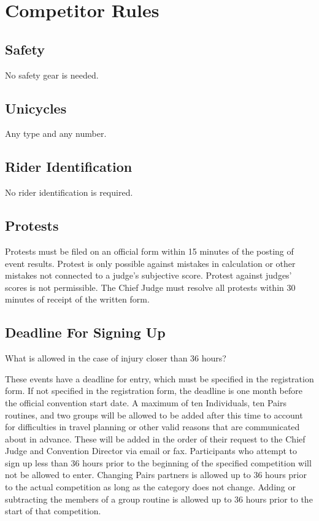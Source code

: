 \chapter{Competitor Rules}

\section{Safety}

No safety gear is needed.

\section{Unicycles}

Any type and any number.

\section{Rider Identification}

No rider identification is required. %

\section{Protests}


Protests must be filed on an official form within 15 minutes of the posting of event results.
Protest is only possible against mistakes in calculation or other mistakes not connected to a judge's subjective score. 
Protest against judges' scores is not permissible.
The Chief Judge must resolve all protests within 30 minutes of receipt of the written form.

\section{Deadline For Signing Up}

\begin{comment2016}
What is allowed in the case of injury closer than 36 hours?
\end{comment2016}

These events have a deadline for entry, which must be specified in the registration form.
If not specified in the registration form, the deadline is one month before the official convention start date.
A maximum of ten Individuals, ten Pairs routines, and two groups will be allowed to be added after this time to account for difficulties in travel planning or other valid reasons that are communicated about in advance.
These will be added in the order of their request to the Chief Judge and Convention Director via email or fax.
Participants who attempt to sign up less than 36 hours prior to the beginning of the specified competition will not be allowed to enter.
Changing Pairs partners is allowed up to 36 hours prior to the actual competition as long as the category does not change.
Adding or subtracting the members of a group routine is allowed up to 36 hours prior to the start of that competition.

